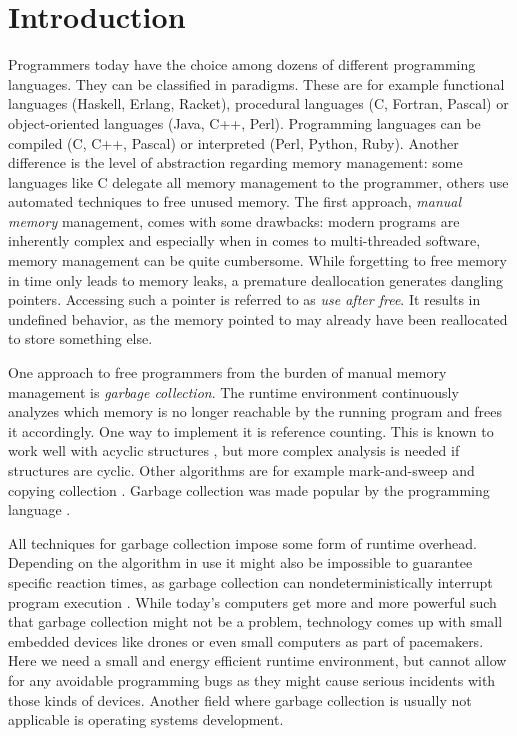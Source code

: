\chapter{Introduction}

Programmers today have the choice among dozens of different programming languages.
They can be classified in paradigms.
These are for example functional languages (Haskell, Erlang, Racket), procedural languages (C, Fortran, Pascal) or object-oriented languages (Java, C++, Perl).
Programming languages can be compiled (C, C++, Pascal) or interpreted (Perl, Python, Ruby).
Another difference is the level of abstraction regarding memory management:
some languages like C delegate all memory management to the programmer, others use automated techniques to free unused memory.
The first approach, \emph{manual memory} management, comes with some drawbacks:
modern programs are inherently complex and especially when in comes to multi-threaded software, memory management can be quite cumbersome.
While forgetting to free memory in time only leads to memory leaks, a premature deallocation generates dangling pointers.
Accessing such a pointer is referred to as \emph{use after free}.
It results in undefined behavior, as the memory pointed to may already have been reallocated to store something else.

One approach to free programmers from the burden of manual memory management is \emph{garbage collection}.
The runtime environment continuously analyzes which memory is no longer reachable by the running program and frees it accordingly.
One way to implement it is reference counting.
This is known to work well with acyclic structures \cite{Bevan1987}, but more complex analysis is needed if structures are cyclic.
Other algorithms are for example mark-and-sweep and copying collection \cite{Zorn:1990:CMS:91556.91597}.
Garbage collection was made popular by the \java programming language \cite{Venners:1996:IJV:541297}.

All techniques for garbage collection impose some form of runtime overhead.
Depending on the algorithm in use it might also be impossible to guarantee specific reaction times, as garbage collection can nondeterministically interrupt program execution \cite{andreae2007scoped}.
While today's computers get more and more powerful such that garbage collection might not be a problem, technology comes up with small embedded devices like drones or even small computers as part of pacemakers.
Here we need a small and energy efficient runtime environment, but cannot allow for any avoidable programming bugs as they might cause serious incidents with those kinds of devices.
Another field where garbage collection is usually not applicable is operating systems development.

